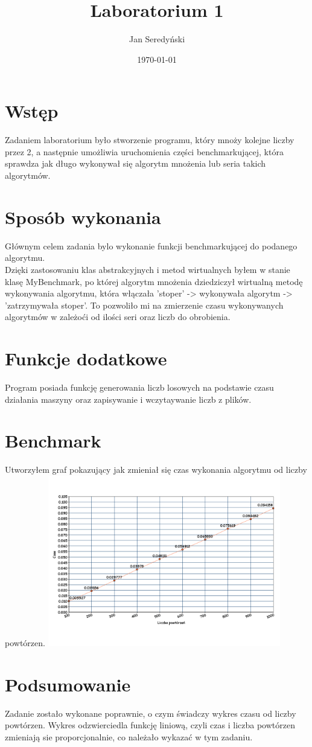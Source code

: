 \documentclass[11pt]{article}
\begin{document}
\title{Laboratorium 1}
\author{Jan Seredyński}
\date{\today}
\maketitle

\section{Wstęp}
Zadaniem laboratorium było stworzenie programu, który mnoży kolejne liczby przez 2,
 a następnie umożliwia uruchomienia części benchmarkującej, która sprawdza jak długo
wykonywał się algorytm mnożenia lub seria takich algorytmów.

\section{Sposób wykonania}
Głównym celem zadania bylo wykonanie funkcji benchmarkującej do podanego algorytmu.\\
Dzięki zastosowaniu klas abstrakcyjnych i metod wirtualnych byłem w stanie klasę MyBenchmark, po której algorytm mnożenia dziedziczył wirtualną metodę wykonywania algorytmu, która włączała 'stoper' -> wykonywała algorytm -> 'zatrzymywała stoper'. To pozwoliło mi na zmierzenie czasu wykonywanych algorytmów w zależoći od ilości seri oraz liczb do obrobienia.

\section{Funkcje dodatkowe}
Program posiada funkcję generowania liczb losowych na podstawie czasu działania maszyny oraz zapisywanie i wczytaywanie liczb z plików.

\section{Benchmark}
Utworzyłem graf pokazujący jak zmieniał się czas wykonania algorytmu od liczby powtórzen.
\includegraphics[width=4in]{blank.png} 


\section{Podsumowanie}
Zadanie zostało wykonane poprawnie, o czym świadczy wykres czasu od liczby powtórzen. Wykres odzwierciedla funkcję liniową, czyli czas i liczba powtórzen zmieniają sie proporcjonalnie, co należało wykazać w tym zadaniu.
\end{document}

